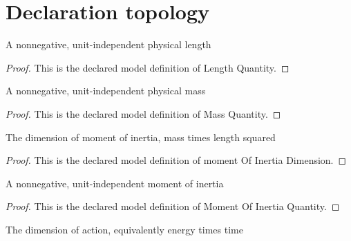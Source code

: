 \section{Declaration topology}
\begin{definition}
  \label{def:physics:phyx-mini-0631:phyxminiproblems-problemphyxmini0631-lengthquantity}
  A nonnegative, unit-independent physical length
\end{definition}
\begin{proof}
  This is the declared model definition of Length Quantity.
\end{proof}
\begin{definition}
  \label{def:physics:phyx-mini-0631:phyxminiproblems-problemphyxmini0631-massquantity}
  A nonnegative, unit-independent physical mass
\end{definition}
\begin{proof}
  This is the declared model definition of Mass Quantity.
\end{proof}
\begin{definition}
  \label{def:physics:phyx-mini-0631:phyxminiproblems-problemphyxmini0631-momentofinertiadimension}
  The dimension of moment of inertia, mass times length squared
\end{definition}
\begin{proof}
  This is the declared model definition of moment Of Inertia Dimension.
\end{proof}
\begin{definition}
  \label{def:physics:phyx-mini-0631:phyxminiproblems-problemphyxmini0631-momentofinertiaquantity}
  A nonnegative, unit-independent moment of inertia
\end{definition}
\begin{proof}
  This is the declared model definition of Moment Of Inertia Quantity.
\end{proof}
\begin{definition}
  \label{def:physics:phyx-mini-0631:phyxminiproblems-problemphyxmini0631-actiondimension}
  The dimension of action, equivalently energy times time
\end{definition}
